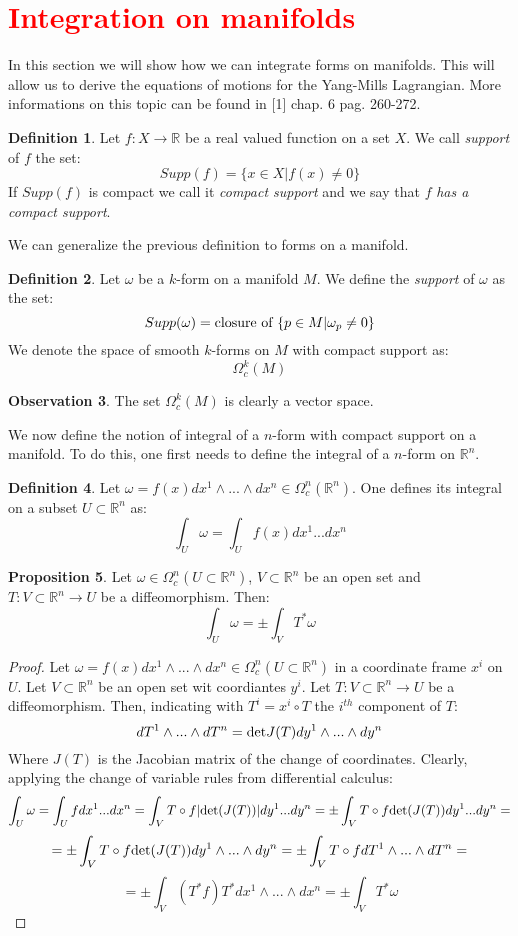 \documentclass[12pt,a4paper]{report}
\theoremstyle{definition}
\newtheorem{Def}{Definition}[chapter]
\theoremstyle{Theorem}
\newtheorem{Prop}[Def]{Proposition}
\theoremstyle{definition}
\theoremstyle{definition}
\newtheorem{Obs}[Def]{Observation}
\begin{document}
	\section{\textcolor{red}{Integration on manifolds}}
	In this section we will show how we can integrate forms on manifolds. This will allow us to derive the equations of motions for the Yang-Mills Lagrangian. More informations on this topic can be found in [1] chap. 6 pag. 260-272.
	\begin{Def}
		Let $f:X\rightarrow \mathbb{R}$ be a real valued function on a set $X$. We call \textit{support} of $f$ the set:
		$$Supp(f)=\{x\in X|f(x)\neq 0\}$$
		If $Supp(f)$ is compact we call it \textit{compact support} and we say that $f$ \textit{has a compact support}.
	\end{Def}
	We can generalize the previous definition to forms on a manifold.
	\begin{Def}
		Let $\omega$ be a $k$-form on a manifold $M$. We define the \textit{support} of $\omega$ as the set:
		$$Supp(\omega)=\hbox{closure of }\{p\in M|\omega_p\neq 0\}$$
		We denote the space of smooth $k$-forms on $M$ with compact support as:
		$$\Omega_c^k(M)$$
	\end{Def}
	\begin{Obs}
		The set $\Omega^k_c(M)$ is clearly a vector space.
	\end{Obs}
	We now define the notion of integral of a $n$-form with compact support on a manifold. To do this, one first needs to define the integral of a $n$-form on $\mathbb{R}^n$.
	\begin{Def}
		Let $\omega=f(x)dx^1\wedge...\wedge dx^n\in\Omega^n_c(\mathbb{R}^n)$. One defines its integral on a subset $U\subset\mathbb{R}^n$ as:
		$$\int_U\omega=\int_Uf(x)dx^1...dx^n$$ 
	\end{Def}
	\begin{Prop}
		Let $\omega\in\Omega^n_c(U\subset \mathbb{R}^n)$, $V\subset \mathbb{R}^n$ be an open set and $T:V\subset \mathbb{R}^n\rightarrow U$ be a diffeomorphism. Then:
		$$\int_U\omega=\pm\int_VT^*\omega$$
	\end{Prop}
	\begin{proof}
		Let $\omega=f(x)dx^1\wedge...\wedge dx^n\in\Omega^n_c(U\subset \mathbb{R}^n)$ in a coordinate frame $x^i$ on $U$. Let $V\subset \mathbb{R}^n$ be an open set wit coordiantes $y^i$. Let $T:V\subset \mathbb{R}^n\rightarrow U$ be a diffeomorphism. Then, indicating with $T^i=x^i\circ T$ the $i^{th}$ component of $T$:
		$$dT^1\wedge...\wedge dT^n=\hbox{det}J(T)dy^1\wedge...\wedge dy^n$$
		Where $J(T)$ is the Jacobian matrix of the change of coordinates. Clearly, applying the change of variable rules from differential calculus:
		$$\int_U\omega=\int_Uf dx^1...dx^n=\int_V T\circ f |\hbox{det}(J(T))|dy^1...dy^n=\pm\int_V T\circ f \hbox{det}(J(T))dy^1...dy^n=$$
		$$=\pm\int_V T\circ f \hbox{det}(J(T))dy^1\wedge...\wedge dy^n=\pm\int_V T\circ f dT^1\wedge...\wedge dT^n=$$
		$$=\pm\int_V(T^*f)T^*dx^1\wedge...\wedge dx^n=\pm\int_V T^*\omega$$
	\end{proof}
\end{document}

